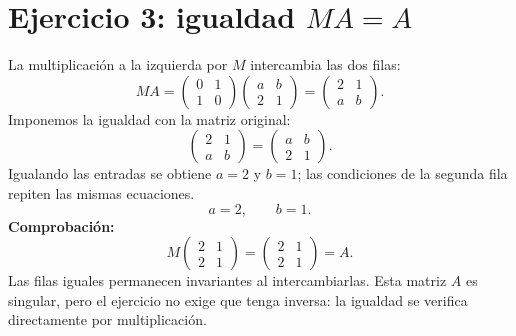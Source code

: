 \documentclass[11pt]{article}
\begin{document}
\section*{Ejercicio 3: igualdad $MA=A$}
La multiplicación a la izquierda por $M$ intercambia las dos filas:
\[
MA=\begin{pmatrix}0&1\\1&0\end{pmatrix}
\begin{pmatrix}a&b\\2&1\end{pmatrix}
=\begin{pmatrix}2&1\\a&b\end{pmatrix}.
\]
Imponemos la igualdad con la matriz original:
\[
\begin{pmatrix}2&1\\a&b\end{pmatrix}
=\begin{pmatrix}a&b\\2&1\end{pmatrix}.
\]
Igualando las entradas se obtiene $a=2$ y $b=1$; las condiciones de la segunda fila repiten las mismas ecuaciones.
\[\boxed{a=2,\qquad b=1}.\]
\textbf{Comprobación:}
\[
M\begin{pmatrix}2&1\\2&1\end{pmatrix}
=\begin{pmatrix}2&1\\2&1\end{pmatrix}=A.
\]
Las filas iguales permanecen invariantes al intercambiarlas. Esta matriz $A$ es singular, pero el ejercicio no exige que tenga inversa: la igualdad se verifica directamente por multiplicación.
\end{document}
